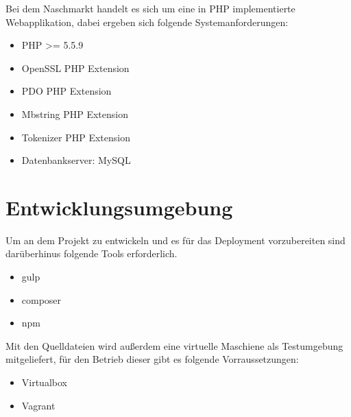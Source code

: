 Bei dem Naschmarkt handelt es sich um eine in PHP implementierte Webapplikation, dabei ergeben sich folgende Systemanforderungen:
\begin{itemize}
    \item PHP >= 5.5.9
    \item OpenSSL PHP Extension
    \item PDO PHP Extension
    \item Mbstring PHP Extension
    \item Tokenizer PHP Extension
    \item Datenbankserver: MySQL
\end{itemize}

\section{Entwicklungsumgebung}
Um an dem Projekt zu entwickeln und es f\"ur das Deployment vorzubereiten sind dar\"uberhinus folgende Tools erforderlich.
\begin{itemize}
    \item gulp
    \item composer
    \item npm
\end{itemize}

Mit den Quelldateien wird au\ss erdem eine virtuelle Maschiene als Testumgebung mitgeliefert, f\"ur den Betrieb dieser gibt es folgende Vorraussetzungen:
\begin{itemize}
    \item Virtualbox
    \item Vagrant
\end{itemize}
